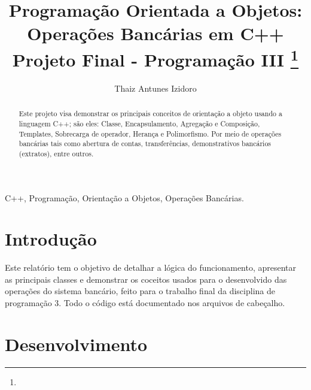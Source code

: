 \documentclass[conference]{IEEEtran}
\begin{document}
\title{Programação Orientada a Objetos: Operações Bancárias em C++\\
{\footnotesize Projeto Final - Programação III}
\thanks{}
}


\author{
\and
{Thaiz Antunes Izidoro}\\
}


\maketitle

\begin{abstract}
    Este projeto visa demonstrar os principais conceitos de orientação a objeto usando a linguagem C++; são eles: Classe, Encapsulamento, Agregação e Composição, Templates, Sobrecarga de operador, Herança e Polimorfismo. Por meio  de operações bancárias tais como abertura de contas, transferências, demonstrativos bancários (extratos), entre outros. 
\end{abstract}

\begin{IEEEkeywords}
    C++, Programação, Orientação a Objetos, Operações Bancárias.
\end{IEEEkeywords}

\section{Introdução}
Este relatório tem o objetivo de detalhar a lógica do funcionamento, apresentar as principais classes e demonstrar os coceitos usados  para o desenvolvido das operações do sistema bancário, feito para o trabalho final da disciplina de programação 3. Todo o código está documentado nos arquivos de cabeçalho.

\section{Desenvolvimento}
\end{document}
